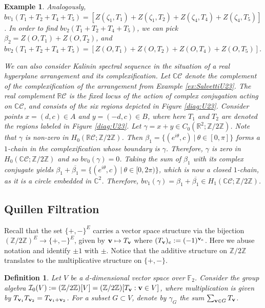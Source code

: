 \documentclass{amsart}
\newtheorem{definition}[theorem]{Definition}
\newtheorem{example}[theorem]{Example}
\newcommand\Ccal{{\mathcal C}}
\newcommand\Ical{{\mathcal I}}
\newcommand\vv{{\bf v}}
\newcommand\ZZ{{\mathbb Z}}
\newcommand\Ztwo{{\mathbb Z}/2{\mathbb Z}}
\newcommand\FF{{\mathbb F}}
\begin{document}
{\begin{example}
Analogously, $bv_1(T_1+T_2+T_4+T_5)=[Z(\zeta_1,T_1)+Z(\zeta_1,T_2)+Z(\zeta_4,T_4)+Z(\zeta_4,T_5)]$. In order to find $bv_2(T_1+T_2+T_4+T_5)$, we can pick $\beta_2=Z(O,T_1)+Z(O,T_2)$, and $bv_2(T_1+T_2+T_4+T_5)=[Z(O,T_1)+Z(O,T_2)+Z(O,T_4)+Z(O,T_5)]$.

We can also consider Kalinin spectral sequence in the situation of a real hyperplane arrangement and its complexification. 
Let $\mathbb{C} \Ccal$ denote the complement of the complexification of the arrangement from Example \ref{ex:SalvettiU23}. The real complement $\mathbb{R} \Ccal$ is the fixed locus of the action of complex conjugation acting on $\mathbb{C} \Ccal$, and consists of the six regions depicted in Figure \ref{diag:U23}. 
Consider points $x = (d, c) \in A$ and $ y = (-d, c) \in B$, where here $T_1$ and $T_2$ are denoted the regions labeled in Figure \ref{diag:U23}. Let $\gamma = x+y \in C_0(\mathbb{R}^2; \Ztwo)$. Note that $\gamma$ is non-zero in $H_0(\mathbb{R} \Ccal; \Ztwo)$.
Then $ \beta_1 = \{ ( e^{i\theta}, c) \ | \ \theta \in [0, \pi] \}$ 
forms a $1$-chain in the complexification 
whose boundary is $\gamma$. Therefore, $\gamma$ is zero in $H_0(\mathbb{C} \Ccal; \Ztwo)$ and so $bv_0 (\gamma) = 0$.
Taking the sum of $\beta_1$ with its complex conjugate yields
$\beta_1 + \overline{\beta_1} = \{ (e^{i\theta}, c) \ | \ \theta \in [0, 2\pi ) \}$, which is now a closed $1$-chain, as it is a circle embedded in $\mathbb{C} ^2$. Therefore, $bv_1(\gamma) = \beta_1 + \overline{\beta_1} \in H_1( \mathbb{C} \Ccal; \Ztwo)$. 
\end{example}

\subsection{Quillen Filtration} \label{sec:Quillen}

Recall that the set $\{+, -\}^E$ carries a vector space structure via the bijection $( \Ztwo)^E \to \{+, -\}^E$, given by ${\bf v} \mapsto   T_{\bf v}$ where $(T_{\bf v})_e := (-1)^{{\bf v}_e}$. Here we abuse notation and identify $\pm 1$ with $\pm$. 
Notice that the additive structure on $\Ztwo$ translates to the multiplicative structure on $\{+, -\}$.
\begin{definition}
Let $V$ be a $d$-dimensional vector space over $\FF_2$.
Consider the group algebra $\Ical_0(V):=(\ZZ/2\ZZ)[V]=(\ZZ/2\ZZ)[T_\vv:\vv\in V]$, where multiplication is given by $T_{\vv_1}T_{\vv_2}=T_{\vv_1+\vv_2}$.
For a subset $G\subset V$, denote by $\gamma_G$ the sum $\sum_{\vv\in G} T_\vv$.


\end{definition}}
\end{document}
